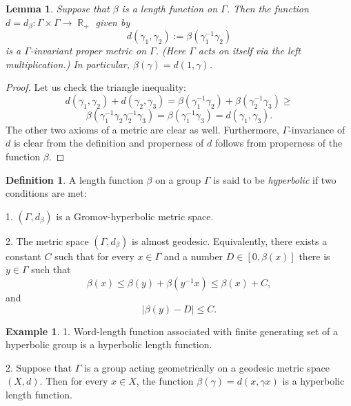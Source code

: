 \documentclass[12pt]{amsbook}%
\newtheorem{lem}[thm]{Lemma}
\theoremstyle{definition}
\newtheorem{defi}[thm]{Definition}
\newtheorem{example}[thm]{Example}
\theoremstyle{remark}
\newtheorem{rem}[thm]{Remark}
\numberwithin{section}{chapter}
\numberwithin{subsection}{section}
\numberwithin{figure}{chapter}
\DeclareMathOperator{\R}{\mathbb{R}}
\def\Ga{\Gamma}
\def\ga{\gamma}
\begin{document}
\begin{lem}\label{lem:dbeta}
Suppose that $\beta$ is a length function on $\Ga$. Then the function $d=d_\beta: \Ga\times \Ga\to \R_+$ given by 
 $$d(\gamma_1, \gamma_2):= \beta(\gamma_1^{-1}\gamma_2)$$ 
 is a $\Ga$-invariant proper metric on $\Ga$. (Here $\Ga$ acts on itself via the left multiplication.) 
 In particular,  $\beta(\ga)=d(1, \ga)$. 
\end{lem}
\begin{proof} Let us check the triangle inequality:
$$
d(\gamma_1, \ga_2) + d(\ga_2, \ga_3)= \beta(\gamma_1^{-1}\gamma_2) + \beta(\gamma_2^{-1}\gamma_3) \geqslant 
$$
$$
\beta(\gamma_1^{-1}\gamma_2\gamma_2^{-1}\gamma_3)= \beta(\gamma_1^{-1}\gamma_3)= d(\ga_1, \ga_3). 
$$
The other two axioms of a metric are clear as well. Furthermore, $\Ga$-invariance of $d$ is clear from the definition and properness of $d$ follows from properness of the function $\beta$. 
\end{proof} 

\begin{defi}
\label{def:hyperbolic length function}%
A length function $\beta$ on a group $\Ga$ is said to be {\em hyperbolic}  if two conditions are met: 

1. $(\Ga, d_\beta)$ is a Gromov-hyperbolic metric space.   

2. The metric space $(\Ga, d_\beta)$ is almost geodesic. Equivalently, there exists a constant $C$ such that 
for every $x\in \Ga$ and a number $D\in [0, \beta(x)]$ there is $y\in \Ga$ such that
$$
\beta(x)\leqslant \beta(y)+ \beta(y^{-1}x) \leqslant \beta(x) +C,
$$
and
$$
|\beta(y)- D|\leqslant C. 
$$
\end{defi}


\begin{example}\label{ex:hyperbolic length}
1. Word-length function associated with finite generating set of a hyperbolic group is a hyperbolic length function. 

2. Suppose that $\Ga$ is a group acting geometrically on a geodesic metric space $(X,d)$. Then for every $x\in X$, 
the function $\beta(\ga)=d(x, \ga x)$ is a hyperbolic length function. 
\end{example}
\end{document}
